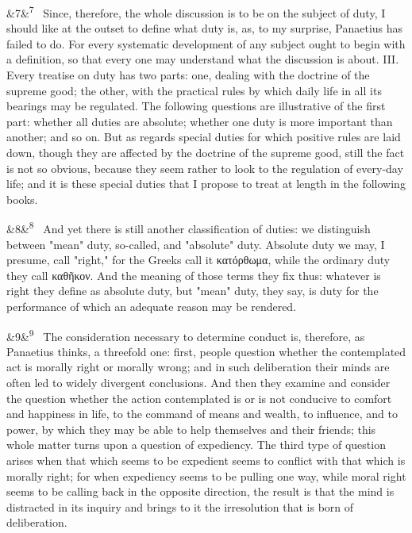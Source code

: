 \documentclass[12pt]{article}
\newcommand{\para}[1][]{\par\noindent\ifx&#1&\else\textsuperscript{\footnotesize #1}~\fi}
\begin{document}
\para[7] Since, therefore, the whole discussion is to be on the subject of duty, I should like at the outset to define what duty is, as, to my surprise, Panaetius has failed to do. For every systematic development of any subject ought to begin with a definition, so that every one may understand what the discussion is about. III. Every treatise on duty has two parts: one, dealing with the doctrine of the supreme good; the other, with the practical rules by which daily life in all its bearings may be regulated. The following questions are illustrative of the first part: whether all duties are absolute; whether one duty is more important than another; and so on. But as regards special duties for which positive rules are laid down, though they are affected by the doctrine of the supreme good, still the fact is not so obvious, because they seem rather to look to the regulation of every-day life; and it is these special duties that I propose to treat at length in the following books.

\para[8] And yet there is still another classification of duties: we distinguish between "mean" duty, so-called, and "absolute" duty. Absolute duty we may, I presume, call "right," for the Greeks call it κατόρθωμα, while the ordinary duty they call καθῆκον. And the meaning of those terms they fix thus: whatever is right they define as absolute duty, but "mean" duty, they say, is duty for the performance of which an adequate reason may be rendered.

\para[9] The consideration necessary to determine conduct is, therefore, as Panaetius thinks, a threefold one: first, people question whether the contemplated act is morally right or morally wrong; and in such deliberation their minds are often led to widely divergent conclusions. And then they examine and consider the question whether the action contemplated is or is not conducive to comfort and happiness in life, to the command of means and wealth, to influence, and to power, by which they may be able to help themselves and their friends; this whole matter turns upon a question of expediency. The third type of question arises when that which seems to be expedient seems to conflict with that which is morally right; for when expediency seems to be pulling one way, while moral right seems to be calling back in the opposite direction, the result is that the mind is distracted in its inquiry and brings to it the irresolution that is born of deliberation.
\end{document}
